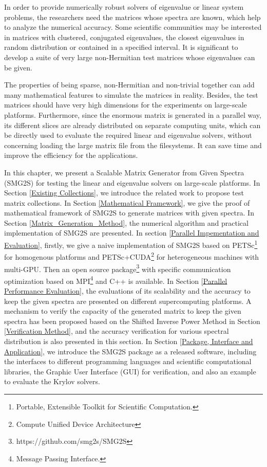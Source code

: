 In order to provide numerically robust solvers of eigenvalue or linear system problems, the researchers need the matrices whose spectra are known, which help to analyze the numerical accuracy. Some scientific communities may be interested in matrices with clustered, conjugated eigenvalues, the closest eigenvalues in random distribution or contained in a specified interval. It is significant to develop a suite of very large non-Hermitian test matrices whose eigenvalues can be given.

The properties of being sparse, non-Hermitian and non-trivial together can add many mathematical features to simulate the matrices in reality. Besides, the test matrices should have very high dimensions for the experiments on large-scale platforms. Furthermore, since the enormous matrix is generated in a parallel way, its different slices are already distributed on separate computing units, which can be directly used to evaluate the required linear and eigenvalue solvers, without concerning loading the large matrix file from the filesystems. It can save time and improve the efficiency for the applications.

In this chapter, we present a Scalable Matrix Generator from Given Spectra (SMG2S) for testing the linear and eigenvalue solvers on large-scale platforms. In Section \ref{Existing Collections}, we introduce the related work to propose test matrix collections. In Section \ref{Mathematical Framework}, we give the proof of mathematical framework of SMG2S to generate matrices with given spectra. In Section \ref{Matrix_Generation_Method}, the numerical algorithm and practical implementation of SMG2S are presented. In section \ref{Parallel Impementation and Evaluation}, firstly, we give a naive implementation of SMG2S based on PETSc\footnote{Portable, Extensible Toolkit for Scientific Computation.} for homogenous platforms and PETSc+CUDA\footnote{Compute Unified Device Architecture} for heterogeneous machines with multi-GPU. Then an open source package\footnote{https://github.com/smg2s/SMG2S} with specific communication optimization based on MPI\footnote{Message Passing Interface.} and C++ is available.  In Section \ref{Parallel Performance Evaluation}, the evaluations of its scalability and the accuracy to keep the given spectra are presented on different supercomputing platforms.  A mechanism to verify the capacity of the generated matrix to keep the given spectra has been proposed based on the Shifted Inverse Power Method in Section \ref{Verification Method}, and the accuracy verification for various spectral distribution is also presented in this section. In Section \ref{Package, Interface and Application}, we introduce the SMG2S package as a released software, including the interfaces to different programming languages and scientific computational libraries, the Graphic User Interface (GUI) for verification, and also an example to evaluate the Krylov solvers. 

